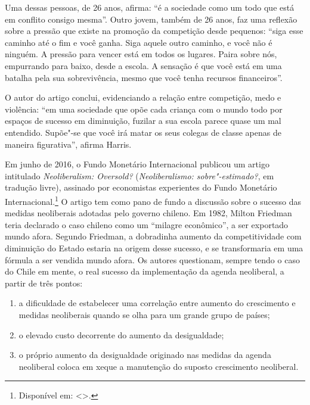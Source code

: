 Uma dessas pessoas, de 26 anos, afirma: ``é a sociedade como um
todo que está em conflito consigo mesma''. Outro jovem, também de 26
anos, faz uma reflexão sobre a pressão que existe na promoção da
competição desde pequenos: ``siga esse caminho até o fim e você ganha.
Siga aquele outro caminho, e você não é ninguém. A pressão para vencer
está em todos os lugares. Paira sobre nós, empurrando para baixo, desde
a escola. A sensação é que você está em uma batalha pela sua
sobrevivência, mesmo que você tenha recursos
financeiros''.

O autor do artigo conclui, evidenciando a relação entre
competição, medo e violência: ``em uma sociedade que opõe cada criança
com o mundo todo por espaços de sucesso em diminuição, fuzilar a sua
escola parece quase um mal entendido. Supõe"-se que você irá matar os
seus colegas de classe apenas de maneira figurativa'', afirma
Harris.

\asterisc

Em junho de 2016, o Fundo Monetário Internacional publicou um artigo
intitulado \emph{Neoliberalism: Oversold?} (\emph{Neoliberalismo:
sobre"-estimado?}, em tradução livre), assinado por economistas
experientes do Fundo Monetário Internacional.\footnote{Disponível em: \textless{}{}\textgreater{}.}
O artigo tem como pano de fundo a discussão sobre o sucesso das medidas
neoliberais adotadas pelo governo chileno. Em 1982, Milton Friedman
teria declarado o caso chileno como um ``milagre econômico'', a ser
exportado mundo afora. Segundo Friedman, a dobradinha aumento da
competitividade com diminuição do Estado estaria na origem desse
sucesso, e se transformaria em uma fórmula a ser vendida mundo afora.
Os autores questionam, sempre tendo o caso do Chile em mente, o real
sucesso da implementação da agenda neoliberal, a partir de três pontos:

\begin{enumerate}[label=\roman*.]
\item 
  a dificuldade de estabelecer uma correlação entre aumento do
  crescimento e medidas neoliberais quando se olha para um grande grupo
  de países;
\item 
  o elevado custo decorrente do aumento da desigualdade;
\item 
  o próprio aumento da desigualdade originado nas medidas da agenda
  neoliberal coloca em xeque a manutenção do suposto crescimento
  neoliberal.
\end{enumerate}

